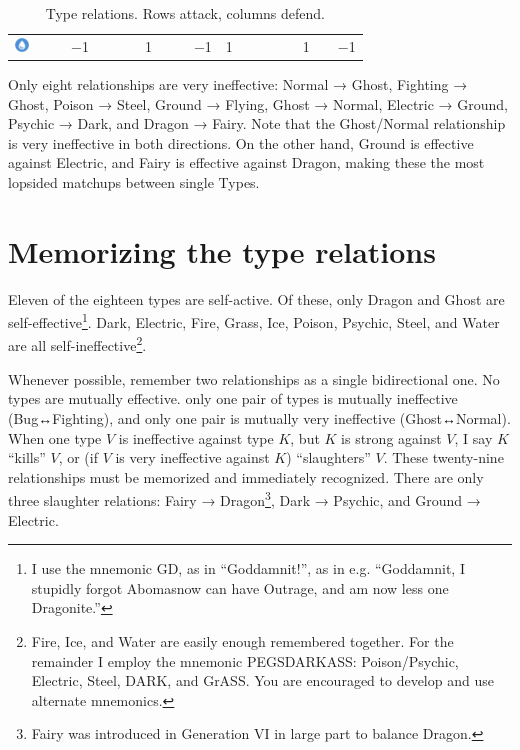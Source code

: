 \begin{table}[ht]
\begin{center}
\begin{tabular}{c g c g c g c g c g c g c g c g c g c}
    \includegraphics[width=1em]{images/water.png} & & & −1 & & & & 1 & & & −1 & 1 & & & & & 1 & & −1 \\ %
\end{tabular}
    \caption[Type relations]{Type relations. Rows attack, columns defend.}
\end{center}
\end{table}

Only eight relationships are very ineffective:
Normal → Ghost,
Fighting → Ghost,
Poison → Steel,
Ground → Flying,
Ghost → Normal,
Electric → Ground,
Psychic → Dark,
and Dragon → Fairy.
Note that the Ghost/Normal relationship is very ineffective in both directions.
On the other hand, Ground is effective against Electric, and Fairy is effective
 against Dragon, making these the most lopsided matchups between single Types.

\section{Memorizing the type relations}
Eleven of the eighteen types are self-active.
Of these, only Dragon and Ghost are
  self-effective\footnote{I use the mnemonic GD, as in ``Goddamnit!'', as in e.g.
  ``Goddamnit, I stupidly forgot Abomasnow can have Outrage, and am now less one Dragonite.''}.
Dark, Electric, Fire, Grass, Ice, Poison, Psychic,
 Steel, and Water are all self-ineffective\footnote{
Fire, Ice, and Water are easily enough remembered together.
For the remainder I employ the mnemonic PEGSDARKASS\@:
  Poison/Psychic, Electric, Steel, DARK, and GrASS\@.
You are encouraged to develop and use alternate mnemonics.}.

Whenever possible, remember two relationships as a single bidirectional one.
No types are mutually effective.
  only one pair of types is mutually ineffective (Bug↔Fighting),
  and only one pair is mutually very ineffective (Ghost↔Normal).
When one type $V$ is ineffective against type $K$, but $K$ is strong
 against $V$, I say $K$ ``kills'' $V$, or
 (if $V$ is very ineffective against $K$) ``slaughters'' $V$.
These twenty-nine relationships must be memorized and immediately recognized.
There are only three slaughter relations: Fairy → Dragon\footnote{Fairy was
  introduced in Generation VI in large part to balance Dragon.}, Dark → Psychic,
  and Ground → Electric.

